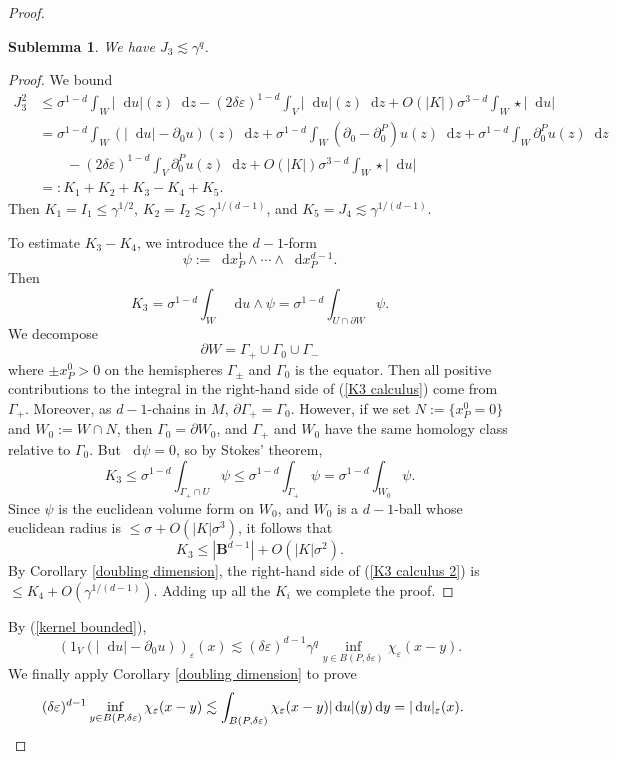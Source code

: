 \documentclass[reqno,11pt]{amsart}
\newcommand{\Ball}{\mathbf{B}}
\newcommand*\dif{\mathop{}\!\mathrm{d}}
\newtheorem{sublemma}[theorem]{Sublemma}
\theoremstyle{definition}
\numberwithin{equation}{section}
\begin{document}
\begin{proof}
\begin{sublemma}
    We have $J_3 \lesssim \gamma^q$.
\end{sublemma}
\begin{proof}
We bound
\begin{align*}
J_3^2 &\leq \sigma^{1 - d} \int_W |\dif u|(z) \dif z - (2 \delta \varepsilon)^{1 - d} \int_V |\dif u|(z) \dif z + O(|K|) \sigma^{3 - d} \int_W \star |\dif u| \\
&= \sigma^{1 - d} \int_W (|\dif u| - \partial_0 u)(z) \dif z + \sigma^{1 - d} \int_W (\partial_0 - \partial_0^P)u(z) \dif z + \sigma^{1 - d} \int_W \partial_0^Pu(z) \dif z \\
  &\qquad - (2 \delta\varepsilon)^{1 - d} \int_V \partial_0^P u(z) \dif z + O(|K|) \sigma^{3 - d} \int_W \star |\dif u| \\
&=: K_1 + K_2 + K_3 - K_4 + K_5.
\end{align*}
Then $K_1 = I_1 \leq \gamma^{1/2}$, $K_2 = I_2 \lesssim \gamma^{1/(d - 1)}$, and $K_5 = J_4 \lesssim \gamma^{1/(d - 1)}$.

To estimate $K_3 - K_4$, we introduce the $d - 1$-form
$$\psi := \dif x^1_P \wedge \cdots \wedge \dif x^{d - 1}_P.$$
Then
\begin{equation}\label{K3 calculus}
K_3 = \sigma^{1 - d} \int_W \dif u \wedge \psi = \sigma^{1 - d} \int_{U \cap \partial W} \psi.
\end{equation}
We decompose
$$\partial W = \Gamma_+ \cup \Gamma_0 \cup \Gamma_-$$
where $\pm x^0_P > 0$ on the hemispheres $\Gamma_\pm$ and $\Gamma_0$ is the equator.
Then all positive contributions to the integral in the right-hand side of (\ref{K3 calculus}) come from $\Gamma_+$.
Moreover, as $d-1$-chains in $M$, $\partial \Gamma_+ = \Gamma_0$.
However, if we set $N := \{x^0_P = 0\}$ and $W_0 := W \cap N$, then $\Gamma_0 = \partial W_0$, and $\Gamma_+$ and $W_0$ have the same homology class relative to $\Gamma_0$.
But $\dif \psi = 0$, so by Stokes' theorem,
$$K_3 \leq \sigma^{1 - d} \int_{\Gamma_+ \cap U} \psi \leq \sigma^{1 - d} \int_{\Gamma_+} \psi = \sigma^{1 - d} \int_{W_0} \psi.$$
Since $\psi$ is the euclidean volume form on $W_0$, and $W_0$ is a $d-1$-ball whose euclidean radius is $\leq \sigma + O(|K| \sigma^3)$, it follows that
\begin{equation}\label{K3 calculus 2}
K_3 \leq |\Ball^{d - 1}| + O(|K| \sigma^2).
\end{equation}
By Corollary \ref{doubling dimension}, the right-hand side of (\ref{K3 calculus 2}) is $\leq K_4 + O(\gamma^{1/(d - 1)})$.
Adding up all the $K_i$ we complete the proof.
\end{proof}

By (\ref{kernel bounded}),
$$(1_V(|\dif u| - \partial_0 u))_\varepsilon(x) \lesssim (\delta\varepsilon)^{d - 1} \gamma^q \inf_{y \in B(P, \delta\varepsilon)} \chi_\varepsilon(x - y).$$
We finally apply Corollary \ref{doubling dimension} to prove
\begin{align*}
(\delta\varepsilon)^{d - 1} \inf_{y \in B(P, \delta\varepsilon)} \chi_\varepsilon(x - y)
&\lesssim \int_{B(P, \delta \varepsilon)} \chi_\varepsilon(x - y) |\dif u|(y) \dif y = |\dif u|_\varepsilon(x). \qedhere
\end{align*}
\end{proof}
\end{document}

